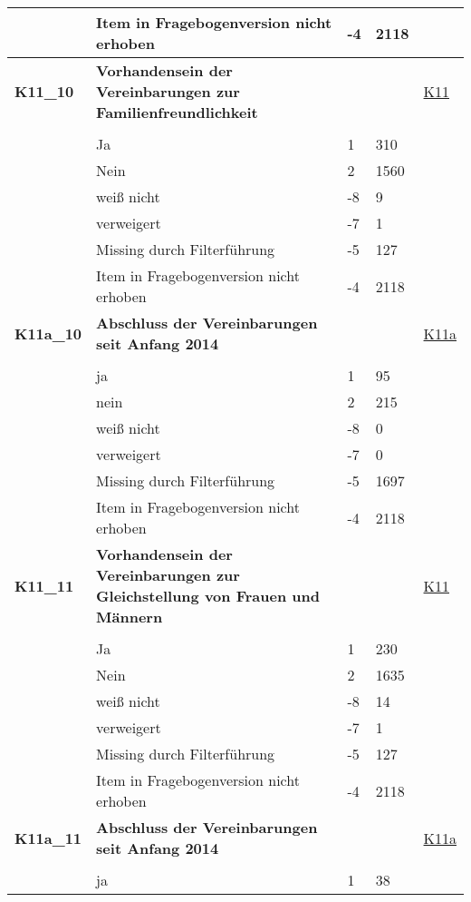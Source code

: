 \begin{longtable}{| L{2.5cm} | L{8.25cm}| C{1.5cm} | R{1.25cm} | C{2.25cm} |  }
   & Item in Fragebogenversion nicht erhoben & -4 & 2118 &  \\ 
   \midrule
\textbf{K11\_10}\label{var:suf:K11:10} & \textbf{Vorhandensein der Vereinbarungen zur Familienfreundlichkeit} &  &  & \hyperref[K11]{K11} \\ 
   &  &  &  &  \\ 
   & Ja & 1 & 310 &  \\ 
   & Nein & 2 & 1560 &  \\ 
   & weiß nicht & -8 & 9 &  \\ 
   & verweigert & -7 & 1 &  \\ 
   & Missing durch Filterführung & -5 & 127 &  \\ 
   & Item in Fragebogenversion nicht erhoben & -4 & 2118 &  \\ 
   \midrule
\textbf{K11a\_10}\label{var:suf:K11a:10} & \textbf{Abschluss der Vereinbarungen seit Anfang 2014} &  &  & \hyperref[K11a]{K11a} \\ 
   &  &  &  &  \\ 
   & ja & 1 & 95 &  \\ 
   & nein & 2 & 215 &  \\ 
   & weiß nicht & -8 & 0 &  \\ 
   & verweigert & -7 & 0 &  \\ 
   & Missing durch Filterführung & -5 & 1697 &  \\ 
   & Item in Fragebogenversion nicht erhoben & -4 & 2118 &  \\ 
   \midrule
\textbf{K11\_11}\label{var:suf:K11:11} & \textbf{Vorhandensein der Vereinbarungen zur Gleichstellung von Frauen und Männern} &  &  & \hyperref[K11]{K11} \\ 
   &  &  &  &  \\ 
   & Ja & 1 & 230 &  \\ 
   & Nein & 2 & 1635 &  \\ 
   & weiß nicht & -8 & 14 &  \\ 
   & verweigert & -7 & 1 &  \\ 
   & Missing durch Filterführung & -5 & 127 &  \\ 
   & Item in Fragebogenversion nicht erhoben & -4 & 2118 &  \\ 
   \midrule
\textbf{K11a\_11}\label{var:suf:K11a:11} & \textbf{Abschluss der Vereinbarungen seit Anfang 2014} &  &  & \hyperref[K11a]{K11a} \\ 
   &  &  &  &  \\ 
   & ja & 1 & 38 &  \\ 

\end{longtable}
